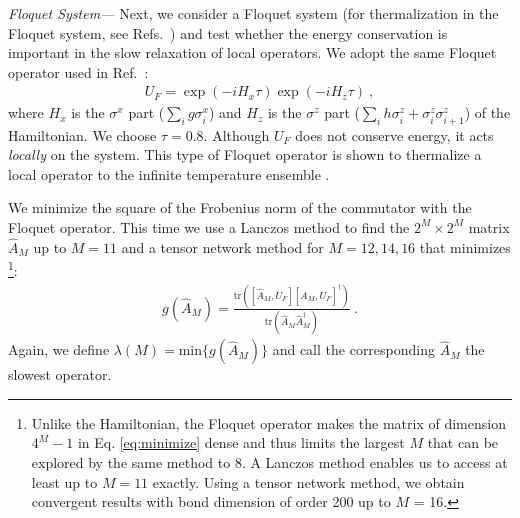 \documentclass[twocolumn,superscriptaddress, prl,showpacs]{revtex4-1}
\begin{document}
{\it Floquet System---}
Next, we consider a Floquet system (for thermalization in the Floquet system, see Refs.~) and test whether the energy conservation is important in the slow relaxation of local operators.
We adopt the same Floquet operator used in Ref.~:
\begin{align}
U_F = \exp(-i H_x \tau) \exp(-i H_z \tau) ~,
\label{eq:floquet_op}
\end{align}
where $H_x$ is the $\sigma^x$ part ($\sum_i g \sigma^x_i$) and $H_z$ is the $\sigma^z$ part ($\sum_i h \sigma^z_i +\sigma^z_i \sigma^z_{i+1}$)
of the Hamiltonian. We choose $\tau = 0.8$.
Although $U_F$ does not conserve energy, it acts {\it locally} on the system.
This type of Floquet operator is shown to thermalize a local operator to the infinite temperature ensemble \cite{Kim_ETH,Prosen:2002}.

We minimize the square of the Frobenius norm of the commutator with the Floquet operator.
This time we use a Lanczos method to find the $2^M \times 2^M$ matrix $\hat{A}_M$ up to $M = 11$ and a tensor network method for $M = 12, 14, 16$
that minimizes \footnote{Unlike the Hamiltonian, the Floquet operator makes the matrix of dimension $4^M-1$ in Eq. \eqref{eq:minimize} dense and thus
limits the largest $M$ that can be explored by the same method to 8. A Lanczos method enables us to access at least up to $M = 11$ exactly.
Using a tensor network method, we obtain convergent results with bond dimension of order 200 up to $M$ = 16.}:
\begin{align}\label{eq:floquet_minimize}
g(\hat{A}_M) = \frac{\mathrm{tr}([\hat{A}_M,U_F][\hat{A}_M,U_F]^\dag)}{\mathrm{tr}(\hat{A}_M\hat{A}_M^\dag)} ~.
\end{align}
Again, we define $\lambda(M) = \mathrm{min}\{g(\hat{A}_M)\}$ and
call the corresponding $\hat{A}_M$ the slowest operator.
\end{document}
